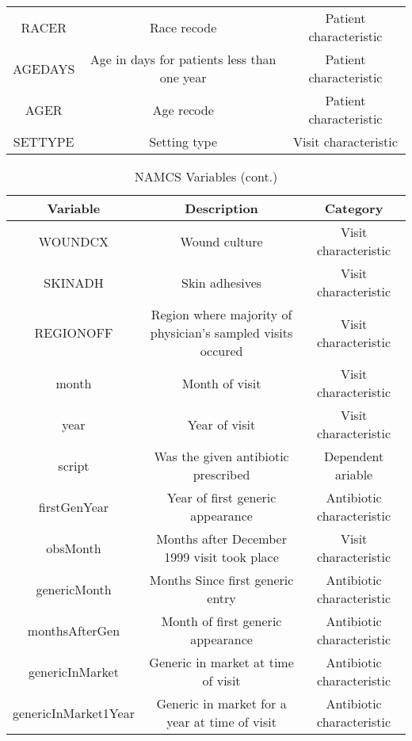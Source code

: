 \documentclass[11pt]{SelfArxOneColBMN}
\begin{document}
\begin{table*}[t]
\begin{tabular}{|c|c|c|}
    RACER & Race recode & Patient characteristic\\
    AGEDAYS & Age in days for patients less than one year & Patient characteristic\\
    AGER & Age recode & Patient characteristic\\
    SETTYPE & Setting type & Visit characteristic\\
    \hline
  \end{tabular}
  \label{tab:1}
\end{table*}

\begin{table*}[h!]
  \centering
  \caption{NAMCS Variables (cont.)} %
  \begin{tabular}{|c|c|c|}
  \hline
  Variable & Description & Category\\
  \hline
    WOUNDCX & Wound culture & Visit characteristic\\
    SKINADH & Skin adhesives & Visit characteristic\\
    REGIONOFF & Region where majority of physician's sampled visits occured & Visit characteristic\\
    month & Month of visit & Visit characteristic\\
    year & Year of visit & Visit characteristic\\
    script & Was the given antibiotic prescribed & Dependent ariable\\
    firstGenYear & Year of first generic appearance & Antibiotic characteristic \\
    obsMonth & Months after December 1999 visit took place & Visit characteristic\\
    genericMonth & Months Since first generic entry & Antibiotic characteristic\\
    monthsAfterGen & Month of first generic appearance & Antibiotic characteristic\\
    genericInMarket & Generic in market at time of visit & Antibiotic characteristic\\
    genericInMarket1Year & Generic in market for a year at time of visit & Antibiotic characteristic\\
  \hline
  \end{tabular}
  \label{tab:1}
\end{table*}
\end{document}
